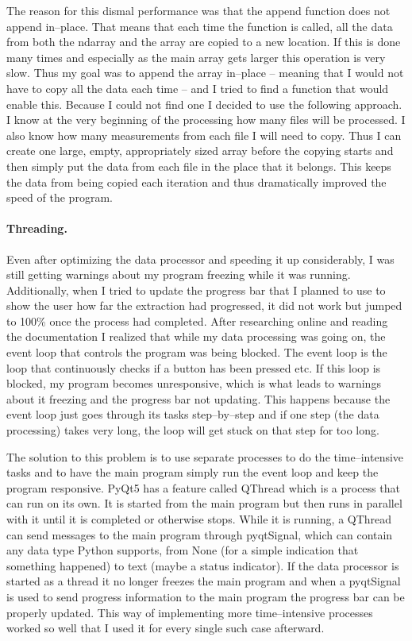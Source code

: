 \documentclass[../00_main.tex]{subfiles}
\begin{document}
The reason for this dismal performance was that the append function does
not append in--place. That means that each time the function is called, all the
data from both the ndarray and the array are copied to a new location. If this 
is done many times and especially as the main array gets larger this operation is 
very slow. Thus my goal was to append the array in--place -- meaning that I 
would not have to copy all the data each time -- and I tried to find a function 
that would enable this. Because I could not find one I decided to use the 
following approach. I know at the very beginning of the processing how many 
files will be processed. I also know how many measurements from each file I 
will need to copy. Thus I can create one large, empty, appropriately sized 
array before the copying starts and then simply put the data from each file in 
the place that it belongs. This keeps the data from being copied each iteration 
and thus dramatically improved the speed of the program.

\paragraph{Threading.} 

Even after optimizing the data processor and speeding it up considerably, I was 
still getting warnings about my program freezing while it was running. 
Additionally, when I tried to update the progress bar that I planned to use to 
show the user how far the extraction had progressed, it did not work but jumped 
to 100\% once the process had completed. After researching online and reading 
the documentation I realized that while my data processing was going on, the 
event loop that controls the program was being blocked. The event loop is the 
loop that continuously checks if a button has been pressed etc. If this loop is 
blocked, my program becomes unresponsive, which is what leads to warnings about 
it freezing and the progress bar not updating. This happens because the event
loop just goes through its tasks step--by--step and if one step (the data
processing) takes very long, the loop will get stuck on that step for too
long.\newline

The solution to this problem is to use separate processes to do the 
time--intensive tasks and to have the main program simply run the event loop 
and keep the program responsive. PyQt5 has a feature called QThread which is
a process that can run on its own. It is started from the main program but then
runs in parallel with it until it is completed or otherwise stops. While it is
running, a QThread can send messages to the main program through pyqtSignal, 
which can contain any data type Python supports, from None (for a simple 
indication that something happened) to text (maybe a status indicator). If the 
data processor is started as a thread it no longer freezes the main program and 
when a pyqtSignal is used to send progress information to the main program the 
progress bar can be properly updated. This way of implementing more 
time--intensive processes worked so well that I used it for every single such 
case afterward.
\end{document}
